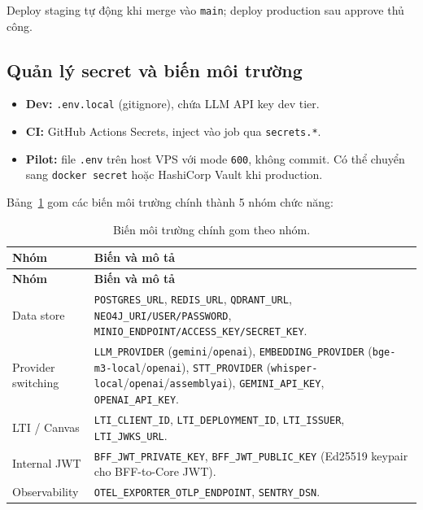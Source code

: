 Deploy staging tự động khi merge vào \texttt{main}; deploy production
sau approve thủ công.

\subsection{Quản lý secret và biến môi trường}

\begin{itemize}
    \item \textbf{Dev:} \texttt{.env.local} (gitignore), chứa LLM API
          key dev tier.
    \item \textbf{CI:} GitHub Actions Secrets, inject vào job qua
          \texttt{secrets.*}.
    \item \textbf{Pilot:} file \texttt{.env} trên host VPS với mode
          \texttt{600}, không commit. Có thể chuyển sang
          \texttt{docker secret} hoặc HashiCorp Vault khi production.
\end{itemize}

Bảng~\ref{tab:env-vars} gom các biến môi trường chính thành 5 nhóm
chức năng:

\begin{longtable}{|p{3cm}|p{10.5cm}|}
\caption{Biến môi trường chính gom theo nhóm.}
\label{tab:env-vars} \\
\hline
\textbf{Nhóm} & \textbf{Biến và mô tả} \\
\hline
\endfirsthead
\hline
\textbf{Nhóm} & \textbf{Biến và mô tả} \\
\hline
\endhead

Data store
    & \texttt{POSTGRES\_URL}, \texttt{REDIS\_URL}, \texttt{QDRANT\_URL},
      \texttt{NEO4J\_URI/USER/PASSWORD},
      \texttt{MINIO\_ENDPOINT/ACCESS\_KEY/SECRET\_KEY}. \\
\hline
Provider switching
    & \texttt{LLM\_PROVIDER} (\texttt{gemini}/\texttt{openai}),
      \texttt{EMBEDDING\_PROVIDER}
      (\texttt{bge-m3-local}/\texttt{openai}),
      \texttt{STT\_PROVIDER}
      (\texttt{whisper-local}/\texttt{openai}/\texttt{assemblyai}),
      \texttt{GEMINI\_API\_KEY}, \texttt{OPENAI\_API\_KEY}. \\
\hline
LTI / Canvas
    & \texttt{LTI\_CLIENT\_ID}, \texttt{LTI\_DEPLOYMENT\_ID},
      \texttt{LTI\_ISSUER}, \texttt{LTI\_JWKS\_URL}. \\
\hline
Internal JWT
    & \texttt{BFF\_JWT\_PRIVATE\_KEY}, \texttt{BFF\_JWT\_PUBLIC\_KEY}
      (Ed25519 keypair cho BFF-to-Core JWT). \\
\hline
Observability
    & \texttt{OTEL\_EXPORTER\_OTLP\_ENDPOINT}, \texttt{SENTRY\_DSN}. \\
\hline
\end{longtable}


